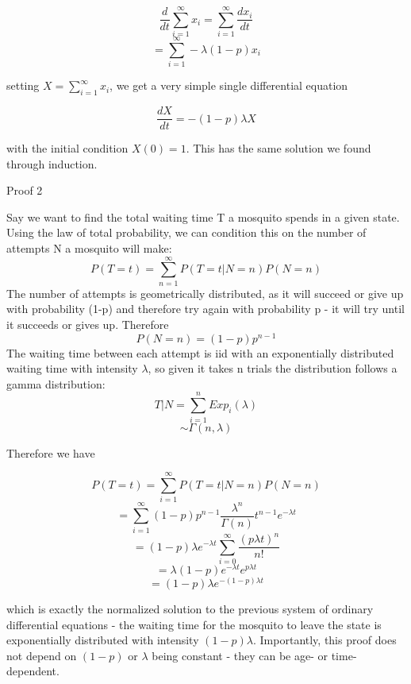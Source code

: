 \documentclass{article}
\begin{document}
$$\frac{d}{dt} \sum_{i=1}^{\infty} x_i = \sum_{i=1}^{\infty}\frac{d x_i}{dt}$$
$$ = \sum_{i=1}^{\infty}-\lambda (1-p) x_i$$

setting $X = \sum_{i=1}^{\infty}x_i$, we get a very simple single differential equation

$$\frac{dX}{dt} = - (1-p) \lambda X$$

with the initial condition $X(0) = 1$. This has the same solution we found through induction.

\begin{bf}
Proof 2
\end{bf}

Say we want to find the total waiting time T a mosquito spends in a given state.
Using the law of total probability, we can condition this on the number of attempts N
a mosquito will make:
$$P(T=t) = \sum_{n=1}^{\infty} P(T=t| N=n) P(N=n)$$
The number of attempts is geometrically distributed, as it will succeed or give up
with probability (1-p) and therefore try again with probability p - it will try until
it succeeds or gives up. Therefore
$$P(N=n) = (1-p)p^{n-1}$$
The waiting time between each attempt is iid with an exponentially distributed waiting
time with intensity $\lambda$, so given it takes n trials the distribution follows
a gamma distribution:
$$T|N = \sum_{i=1}^{n}Exp_i(\lambda)$$
$$ \sim \Gamma (n,\lambda)$$

Therefore we have

$$P(T=t) = \sum_{i=1}^{\infty}P(T=t|N=n)P(N=n)$$
$$ = \sum_{i=1}^{\infty}(1-p)p^{n-1}\frac{\lambda^n}{\Gamma (n)}t^{n-1} e^{-\lambda t}$$
$$ = (1-p) \lambda e^{-\lambda t} \sum_{i=0}^{\infty} \frac{(p\lambda t)^n}{n!}$$
$$ = \lambda (1-p) e^{-\lambda t} e^{p\lambda t}$$
$$ = (1-p) \lambda e^{-(1-p) \lambda t} $$

which is exactly the normalized solution to the previous system of ordinary differential
equations - the waiting time for the mosquito to leave the state is exponentially 
distributed with intensity $(1-p) \lambda$. Importantly, this proof does not depend on
$(1-p)$ or $\lambda$ being constant - they can be age- or time-dependent.
\end{document}
